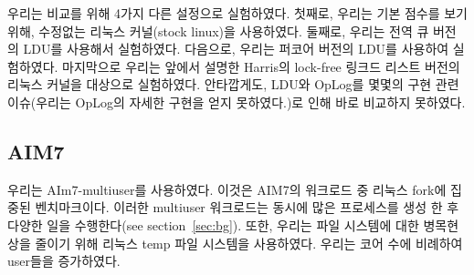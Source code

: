 우리는 비교를 위해 4가지 다른 설정으로 실험하였다. 
첫째로, 우리는 기본 점수를 보기 위해, 수정없는 리눅스 커널(stock linux)을 사용하였다.
둘째로, 우리는 전역 큐 버전의 LDU를 사용해서 실험하였다.  
다음으로, 우리는 퍼코어 버전의 LDU를 사용하여 실험하였다. 
마지막으로 우리는 앞에서 설명한 Harris의 lock-free 링크드 리스트 버전의 리눅스 커널을 대상으로 
실험하였다.  
안타깝게도, LDU와 OpLog를 몇몇의 구현 관련 이슈(우리는 OpLog의 자세한 구현을 얻지 못하였다.)로
 인해 바로 비교하지 못하였다.

\subsection{AIM7}



우리는 AIm7-multiuser를 사용하였다. 이것은 AIM7의 워크로드 중 리눅스 fork에 집중된 벤치마크이다. 
이러한 multiuser 워크로드는 동시에 많은 프로세스를 생성 한 후 다양한
 일을 수행한다(see section~\ref{sec:bg}).
 또한, 우리는 파일 시스템에 대한 병목현상을 줄이기 위해 리눅스 temp 파일 시스템을 사용하였다. 
우리는 코어 수에 비례하여 user들을 증가하였다. 
 
